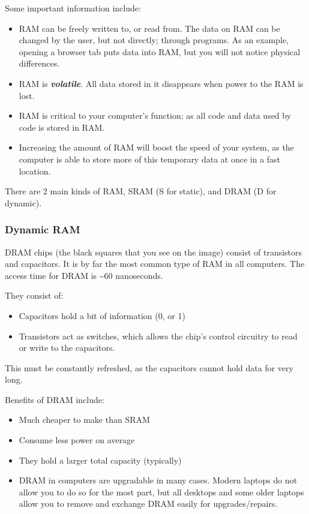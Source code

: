 \documentclass[../main.tex]{subfiles}
\begin{document}
Some important information include:

\begin{itemize}
    \item RAM can be freely written to, or read from. The data on RAM can be changed by the user, but not directly; through programs. As an example, opening a browser tab puts data into RAM, but you will not notice physical differences.
    \item RAM is \textbf{\emph{volatile}}. All data stored in it disappears when power to the RAM is lost.
    \item RAM is critical to your computer's function; as all code and data used by code is stored in RAM.
    \item Increasing the amount of RAM will boost the speed of your system, as the computer is able to store more of this temporary data at once in a fast location.
\end{itemize}

There are 2 main kinds of RAM, SRAM (S for static), and DRAM (D for dynamic).

\subsubsection{Dynamic RAM}

DRAM chips (the black squares that you see on the image) consist of transistors and capacitors. It is by far the most common type of RAM in all computers. The access time for DRAM is \textasciitilde60 nanoseconds.

They consist of:

\begin{itemize}
    \item Capacitors hold a bit of information (0, or 1)
    \item Transistors act as switches, which allows the chip's control circuitry to read or write to the capacitors.
\end{itemize}

This must be constantly refreshed, as the capacitors cannot hold data for very long.

Benefits of DRAM include:

\begin{itemize}
    \item Much cheaper to make than SRAM
    \item Consume less power on average
    \item They hold a larger total capacity (typically)
    \item DRAM in computers are upgradable in many cases. Modern laptops do not allow you to do so for the most part, but all desktops and some older laptops allow you to remove and exchange DRAM easily for upgrades/repairs.
\end{itemize}
\end{document}
